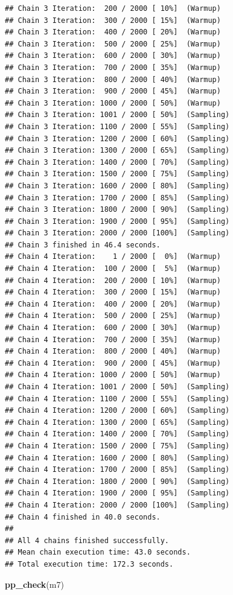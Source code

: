 \documentclass[
]{article}
\newenvironment{Shaded}{\begin{snugshade}}{\end{snugshade}}
\newcommand{\FunctionTok}[1]{\textcolor[rgb]{0.13,0.29,0.53}{\textbf{#1}}}
\newcommand{\NormalTok}[1]{#1}
\begin{document}
\begin{verbatim}
## Chain 3 Iteration:  200 / 2000 [ 10%]  (Warmup) 
## Chain 3 Iteration:  300 / 2000 [ 15%]  (Warmup) 
## Chain 3 Iteration:  400 / 2000 [ 20%]  (Warmup) 
## Chain 3 Iteration:  500 / 2000 [ 25%]  (Warmup) 
## Chain 3 Iteration:  600 / 2000 [ 30%]  (Warmup) 
## Chain 3 Iteration:  700 / 2000 [ 35%]  (Warmup) 
## Chain 3 Iteration:  800 / 2000 [ 40%]  (Warmup) 
## Chain 3 Iteration:  900 / 2000 [ 45%]  (Warmup) 
## Chain 3 Iteration: 1000 / 2000 [ 50%]  (Warmup) 
## Chain 3 Iteration: 1001 / 2000 [ 50%]  (Sampling) 
## Chain 3 Iteration: 1100 / 2000 [ 55%]  (Sampling) 
## Chain 3 Iteration: 1200 / 2000 [ 60%]  (Sampling) 
## Chain 3 Iteration: 1300 / 2000 [ 65%]  (Sampling) 
## Chain 3 Iteration: 1400 / 2000 [ 70%]  (Sampling) 
## Chain 3 Iteration: 1500 / 2000 [ 75%]  (Sampling) 
## Chain 3 Iteration: 1600 / 2000 [ 80%]  (Sampling) 
## Chain 3 Iteration: 1700 / 2000 [ 85%]  (Sampling) 
## Chain 3 Iteration: 1800 / 2000 [ 90%]  (Sampling) 
## Chain 3 Iteration: 1900 / 2000 [ 95%]  (Sampling) 
## Chain 3 Iteration: 2000 / 2000 [100%]  (Sampling) 
## Chain 3 finished in 46.4 seconds.
## Chain 4 Iteration:    1 / 2000 [  0%]  (Warmup) 
## Chain 4 Iteration:  100 / 2000 [  5%]  (Warmup) 
## Chain 4 Iteration:  200 / 2000 [ 10%]  (Warmup) 
## Chain 4 Iteration:  300 / 2000 [ 15%]  (Warmup) 
## Chain 4 Iteration:  400 / 2000 [ 20%]  (Warmup) 
## Chain 4 Iteration:  500 / 2000 [ 25%]  (Warmup) 
## Chain 4 Iteration:  600 / 2000 [ 30%]  (Warmup) 
## Chain 4 Iteration:  700 / 2000 [ 35%]  (Warmup) 
## Chain 4 Iteration:  800 / 2000 [ 40%]  (Warmup) 
## Chain 4 Iteration:  900 / 2000 [ 45%]  (Warmup) 
## Chain 4 Iteration: 1000 / 2000 [ 50%]  (Warmup) 
## Chain 4 Iteration: 1001 / 2000 [ 50%]  (Sampling) 
## Chain 4 Iteration: 1100 / 2000 [ 55%]  (Sampling) 
## Chain 4 Iteration: 1200 / 2000 [ 60%]  (Sampling) 
## Chain 4 Iteration: 1300 / 2000 [ 65%]  (Sampling) 
## Chain 4 Iteration: 1400 / 2000 [ 70%]  (Sampling) 
## Chain 4 Iteration: 1500 / 2000 [ 75%]  (Sampling) 
## Chain 4 Iteration: 1600 / 2000 [ 80%]  (Sampling) 
## Chain 4 Iteration: 1700 / 2000 [ 85%]  (Sampling) 
## Chain 4 Iteration: 1800 / 2000 [ 90%]  (Sampling) 
## Chain 4 Iteration: 1900 / 2000 [ 95%]  (Sampling) 
## Chain 4 Iteration: 2000 / 2000 [100%]  (Sampling) 
## Chain 4 finished in 40.0 seconds.
## 
## All 4 chains finished successfully.
## Mean chain execution time: 43.0 seconds.
## Total execution time: 172.3 seconds.
\end{verbatim}

\begin{Shaded}
\begin{Highlighting}[]
\FunctionTok{pp\_check}\NormalTok{(m7)}
\end{Highlighting}
\end{Shaded}
\end{document}
